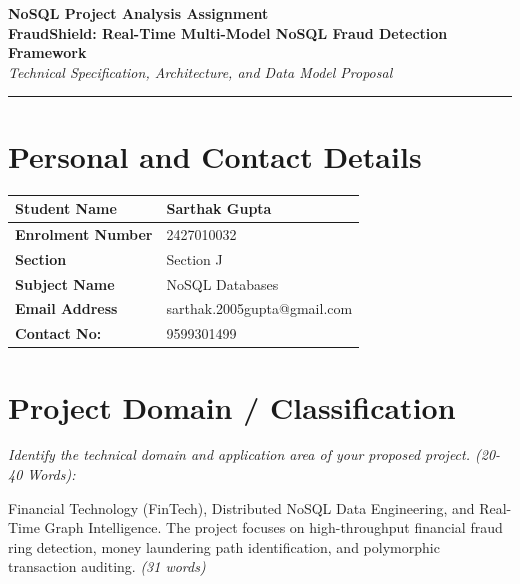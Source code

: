 \documentclass[11pt,a4paper]{article}
\begin{document}
\begin{center}
    {\LARGE \textbf{NoSQL Project Analysis Assignment}}\\[0.4em]
    {\large \textbf{FraudShield: Real-Time Multi-Model NoSQL Fraud Detection Framework}}\\[0.2em]
    {\small \textit{Technical Specification, Architecture, and Data Model Proposal}}\\[1em]
\end{center}

\vspace{-0.5em}
\hrule
\vspace{1em}

\section{Personal and Contact Details}

\begin{table}[h!]
\centering
\renewcommand{\arraystretch}{1.3}
\begin{tabularx}{\textwidth}{|l|X|}
\hline
\textbf{Student Name} & Sarthak Gupta \\ \hline
\textbf{Enrolment Number} & 2427010032 \\ \hline
\textbf{Section} & Section J \\ \hline
\textbf{Subject Name} & NoSQL Databases \\ \hline
\textbf{Email Address} & sarthak.2005gupta@gmail.com \\ \hline
\textbf{Contact No:} & 9599301499 \\ \hline
\end{tabularx}
\end{table}

\section{Project Domain / Classification}
\noindent \textit{Identify the technical domain and application area of your proposed project. (20-40 Words):}

\vspace{0.4em}
\noindent Financial Technology (FinTech), Distributed NoSQL Data Engineering, and Real-Time Graph Intelligence. The project focuses on high-throughput financial fraud ring detection, money laundering path identification, and polymorphic transaction auditing. \textit{(31 words)}
\end{document}
